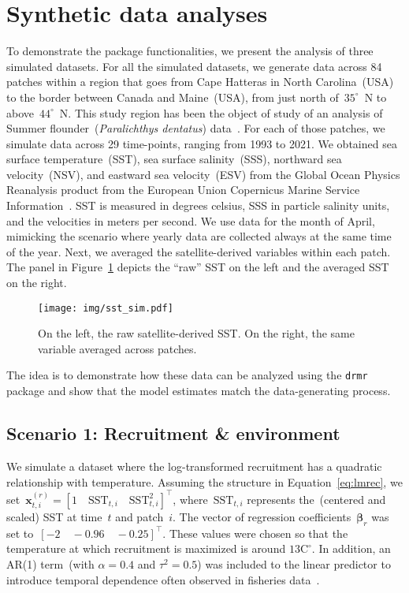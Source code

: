 \section{Synthetic data analyses}


To demonstrate the package functionalities, we present the analysis of three
simulated datasets. For all the simulated datasets, we generate data across 84
patches within a region that goes from Cape Hatteras in North Carolina~(USA) to
the border between Canada and Maine~(USA), from just north of~$35^\circ$~N to
above~$44^\circ$~N. This study region has been the object of study of an analysis of
Summer flounder~(\textit{Paralichthys dentatus})
data~\citep{fredston2025dynamic}. For each of those patches, we simulate data
across 29 time-points, ranging from 1993 to 2021. We obtained sea surface
temperature~(SST), sea surface salinity~(SSS), northward sea velocity~(NSV), and
eastward sea velocity~(ESV) from the Global Ocean Physics Reanalysis product
from the European Union Copernicus Marine Service
Information~\citep{cmems2025global}. SST is measured in degrees celsius, SSS in
particle salinity units, and the velocities in meters per second. We use data
for the month of April, mimicking the scenario where yearly data are collected
always at the same time of the year. Next, we averaged the satellite-derived
variables within each patch. The panel in Figure~\ref{fig:sst} depicts the
``raw'' SST on the left and the averaged SST on the right.

\begin{figure}[tb]
  \centering
  \texttt{[image: img/sst\_sim.pdf]}
  \caption{On the left, the raw satellite-derived SST. On the right, the same
    variable averaged across patches.}\label{fig:sst}
\end{figure}


The idea is to demonstrate how these data can be analyzed using the
\texttt{drmr} package and show that the model estimates match the
data-generating process.

\subsection{Scenario 1: Recruitment \& environment}

We simulate a dataset where the log-transformed recruitment has a quadratic
relationship with temperature. Assuming the structure in
Equation~\eqref{eq:lmrec}, we
set~$\mathbf{x}^{(r)}_{t, i} = [1 \quad \mathrm{SST}_{t, i} \quad \mathrm{SST}^2_{t,
  i}]^{\top}$, where~$\mathrm{SST}_{t, i}$ represents the~(centered and scaled) SST
at time~$t$ and patch~$i$. The vector of regression
coefficients~$\mathbf{\beta}_r$ was set
to~$[-2 \quad -0.96 \quad -0.25]^{\top}$. These values were chosen so that the temperature
at which recruitment is maximized is around $13 \mathrm{C}^{\circ}$. In addition, an
AR(1) term~(with $\alpha = 0.4$ and $\tau^2 = 0.5$) was included to the linear predictor
to introduce temporal dependence often observed in fisheries
data~\citep{johnson2016can}.


